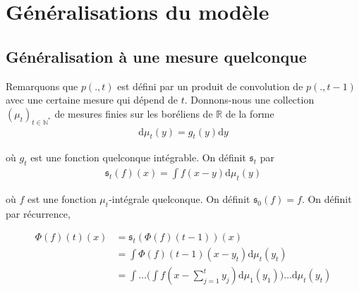 \documentclass{article}
\theoremstyle{definition}
\begin{document}
\section{Généralisations du modèle}
\subsection{Généralisation à une mesure quelconque}
Remarquons que $p(.,t)$ est défini par un produit de convolution de $p(.,t-1)$ avec une certaine mesure qui dépend de $t$. Donnons-nous une collection $(\mu_t)_{t\in\mathbb{N}^*}$ de mesures finies sur les boréliens de $\mathbb{R}$ de la forme  
\begin{align*}
	\mathrm{d}\mu_t(y) = g_t(y)\mathrm{d}y
\end{align*}

où $g_t$ est une fonction quelconque intégrable. On définit $\mathfrak{s}_t$ par
\begin{align}
	\mathfrak{s}_t(f)(x) =\int f(x-y)\mathrm{d}\mu_t(y)
\end{align}

où $f$ est une fonction $\mu_t$-intégrale quelconque. On définit $\mathfrak{s}_0(f) = f$. On définit par récurrence, 

\begin{align*}
	\Phi(f)(t)(x) &= \mathfrak{s}_t(\Phi(f)(t-1))(x)\\
		      &=\int \Phi(f)(t-1)(x-y_t)\mathrm{d}\mu_t(y_t)\\
		      &=\int \ldots \bigg(\int f(x-\sum_{j=1}^t y_j) \mathrm{d}\mu_1(y_1)\bigg)\ldots \mathrm{d}\mu_t(y_t)
\end{align*}
\end{document}
